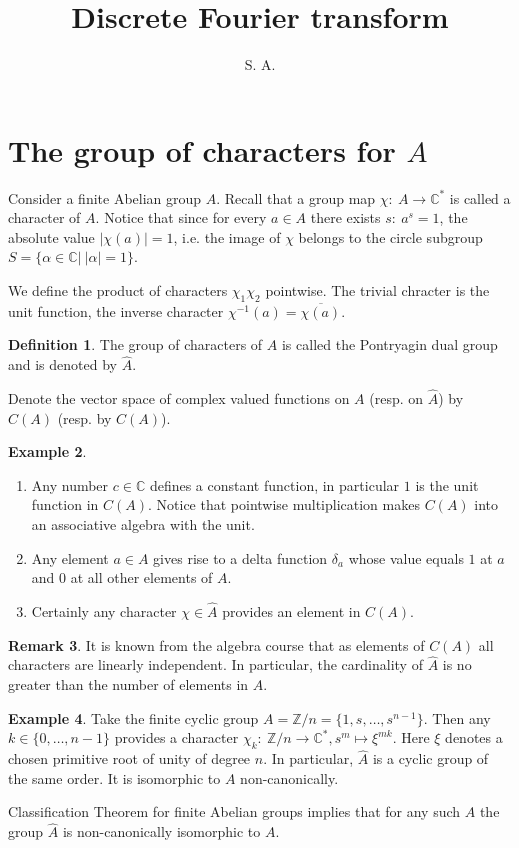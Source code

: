 \documentclass[11pt]{amsart}
\title{Discrete Fourier transform}
\author{S. A.}
\theoremstyle{definition}
\newtheorem{defi}{Definition}[section]
\newtheorem{eg}[defi]{Example}
\newtheorem{rem}[defi]{Remark}
\newcommand{\C}{\mathbb{C}}
\newcommand{\Z}{\mathbb{Z}}
\begin{document}
\maketitle
\section{The group of characters for $A$}
Consider a finite Abelian group $A$. Recall that a group map $\chi:\ A\to \C^*$ is called a character of $A$. Notice that since for every $a\in A$ there exists $s:\ a^s=1$, the absolute value $|\chi(a)|=1$, i.e. the image of $\chi$ belongs to the circle subgroup $S=\{\alpha\in\C| \ |\alpha|=1\}$. 

We define the product of characters $\chi_1\chi_2$ pointwise. The trivial chracter is the unit function, the inverse character $\chi^{-1}(a)=\overline{\chi(a)}$.  
\begin{defi}
    The group of characters of $A$ is called the Pontryagin dual group and is denoted by $\hat{A}$.
\end{defi}
Denote the vector space of complex valued functions on $A$ (resp. on $\hat{A}$) by $C(A)$
(resp. by $C(A)$).
\begin{eg}
\begin{enumerate}
    \item Any number $c\in\C$ defines a constant function, in particular $1$ is the unit function in $C(A)$. Notice that pointwise multiplication makes $C(A)$ into an associative algebra with the unit.
    \item Any element $a\in A$ gives rise to a delta function $\delta_a$ whose value equals $1$ at $a$ and $0$ at all other elements of $A$.
    \item Certainly any character $\chi\in \hat{A}$ provides an element in $C(A)$.
\end{enumerate}
\end{eg}
\begin{rem} It is known from the algebra course that as elements of $C(A)$ all characters are linearly independent. In particular, the cardinality of $\hat{A}$ is no greater than the number of elements in $A$.
\end{rem}
\begin{eg} Take the finite cyclic group $A=\Z/n=\{1,s,\ldots,s^{n-1}\}$. Then any $k\in\{0,\ldots,n-1\}$
 provides a character $\chi_k:\ \Z/n\to \C^*, s^m\mapsto \xi^{mk}$. Here $\xi$ denotes a chosen primitive root of unity of degree $n$. In particular, $\hat{A}$ is a cyclic group of the same order. It is isomorphic to $A$ non-canonically. 

 Classification Theorem for finite Abelian groups implies that for any such $A$ the group $\hat{A}$ is non-canonically isomorphic to $A$.
\end{eg}
\end{document}
